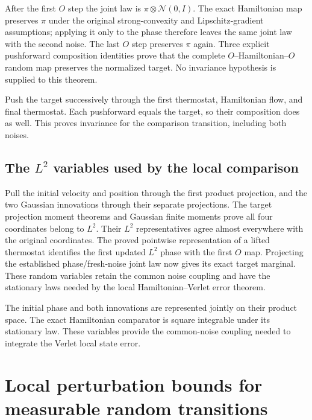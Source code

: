 \documentclass[11pt,a4paper]{report}
\begin{document}
After the first \(O\) step the joint law is \(\pi\otimes\mathcal N(0,I)\). The exact Hamiltonian map preserves \(\pi\) under the original strong-convexity and Lipschitz-gradient assumptions; applying it only to the phase therefore leaves the same joint law with the second noise. The last \(O\) step preserves \(\pi\) again. Three explicit pushforward composition identities prove that the complete \(O\)–Hamiltonian–\(O\) random map preserves the normalized target. No invariance hypothesis is supplied to this theorem.



Push the target successively through the first thermostat, Hamiltonian flow, and final thermostat. Each pushforward equals the target, so their composition does as well. This proves invariance for the comparison transition, including both noises.

\subsection{\texorpdfstring{The \(L^{2}\) variables used by the local comparison}{The L² variables used by the local comparison}}
\label{report-step-KineticLangevin-ExactOBABO-lean-4}


Pull the initial velocity and position through the first product projection, and the two Gaussian innovations through their separate projections. The target projection moment theorems and Gaussian finite moments prove all four coordinates belong to \(L^{2}\). Their \(L^{2}\) representatives agree almost everywhere with the original coordinates. The proved pointwise representation of a lifted thermostat identifies the first updated \(L^{2}\) phase with the first \(O\) map. Projecting the established phase/\allowbreak{}fresh-noise joint law now gives its exact target marginal. These random variables retain the common noise coupling and have the stationary laws needed by the local Hamiltonian–Verlet error theorem.



The initial phase and both innovations are represented jointly on their product space. The exact Hamiltonian comparator is square integrable under its stationary law. These variables provide the common-noise coupling needed to integrate the Verlet local state error.

\section{\texorpdfstring{Local perturbation bounds for measurable random transitions}{Local perturbation bounds for measurable random transitions}}
\label{proof-module-KineticLangevin-RandomMapPerturbation-lean}
\end{document}
